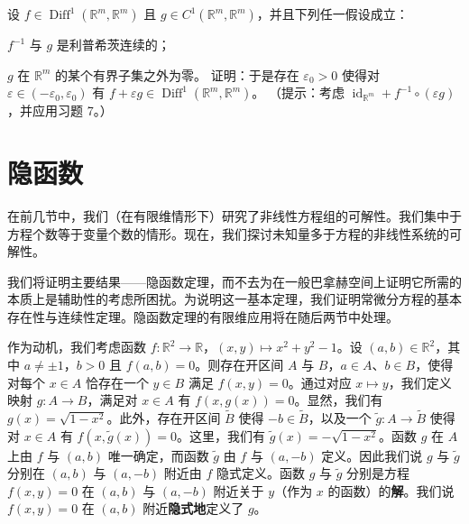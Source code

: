 \begin{exercises}
\item

设 $ f \in \operatorname{Diff}^1(\mathbb{R}^m,\mathbb{R}^m) $ 且 $ g \in C^1(\mathbb{R}^m,\mathbb{R}^m) $，并且下列任一假设成立：

\begin{items}
\item

$ f^{-1} $ 与 $ g $ 是利普希茨连续的；

\item

$ g $ 在 $ \mathbb{R}^m $ 的某个有界子集之外为零。
证明：于是存在 $ \varepsilon_0 > 0 $ 使得对 $ \varepsilon \in (-\varepsilon_0,\varepsilon_0) $ 有 $ f + \varepsilon g \in \operatorname{Diff}^1(\mathbb{R}^m,\mathbb{R}^m) $。
（提示：考虑 $ \operatorname{id}_{\mathbb{R}^m} + f^{-1} \circ (\varepsilon g) $，并应用习题 7。）

\end{items}

\end{exercises}

\section{隐函数}

在前几节中，我们（在有限维情形下）研究了非线性方程组的可解性。我们集中于方程个数等于变量个数的情形。现在，我们探讨未知量多于方程的非线性系统的可解性。

我们将证明主要结果——隐函数定理，而不去为在一般巴拿赫空间上证明它所需的本质上是辅助性的考虑所困扰。为说明这一基本定理，我们证明常微分方程的基本存在性与连续性定理。隐函数定理的有限维应用将在随后两节中处理。

作为动机，我们考虑函数 $ f:\mathbb{R}^{2}\to\mathbb{R} $，$ (x,y)\mapsto x^{2}+y^{2}-1 $。设 $ (a,b)\in\mathbb{R}^{2} $，其中 $ a\ne\pm 1 $，$ b>0 $ 且 $ f(a,b)=0 $。则存在开区间 $ A $ 与 $ B $，$ a\in A $、$ b\in B $，使得对每个 $ x\in A $ 恰存在一个 $ y\in B $ 满足 $ f(x,y)=0 $。通过对应 $ x\mapsto y $，我们定义映射 $ g:A\to B $，满足对 $ x\in A $ 有 $ f(x,g(x))=0 $。显然，我们有 $ g(x)=\sqrt{1-x^{2}} $。此外，存在开区间 $ \widetilde{B} $ 使得 $ -b\in\widetilde{B} $，以及一个 $ \widetilde{g}:A\to\widetilde{B} $ 使得对 $ x\in A $ 有 $ f(x,\widetilde{g}(x))=0 $。这里，我们有 $ \widetilde{g}(x)=-\sqrt{1-x^{2}} $。函数 $ g $ 在 $ A $ 上由 $ f $ 与 $ (a,b) $ 唯一确定，而函数 $ \widetilde{g} $ 由 $ f $ 与 $ (a,-b) $ 定义。因此我们说 $ g $ 与 $ \widetilde{g} $ 分别在 $ (a,b) $ 与 $ (a,-b) $ 附近由 $ f $ 隐式定义。函数 $ g $ 与 $ \widetilde{g} $ 分别是方程 $ f(x,y)=0 $ 在 $ (a,b) $ 与 $ (a,-b) $ 附近关于 $ y $（作为 $ x $ 的函数）的\textbf{解}。我们说 $ f(x,y)=0 $ 在 $ (a,b) $ 附近\textbf{隐式地}定义了 $ g $。


